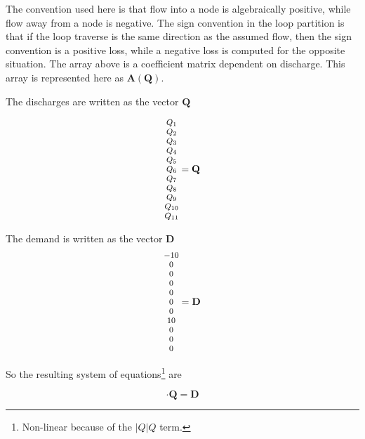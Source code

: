  The convention used here is that flow into a node is algebraically positive, while flow away from a node is negative.  The sign convention in the loop partition is that if the loop traverse is the same direction as the assumed flow, then the sign convention is a positive loss, while a negative loss is computed for the opposite situation.  The array above is a coefficient matrix dependent on discharge.  This array is represented here as $\mathbf{A}(\mathbf{Q})$. 
 
 The discharges are written as the vector  $\mathbf{Q}$
 
 \begin{displaymath}
\footnotesize
\begin{matrix}
Q_1 \\
Q_2  \\
Q_3 \\
Q_4 \\
Q_5 \\
Q_6 \\
Q_7\\
Q_8 \\
Q_9 \\
Q_{10} \\
Q_{11} \\
 \end{matrix}
 = \mathbf{Q}
 \normalsize
 \end{displaymath}
 
 The demand is written as the vector $\mathbf{D}$
 \begin{displaymath}
\footnotesize
\begin{matrix}
-10 \\
0  \\
0 \\
0\\
0 \\
0 \\
0\\
10 \\
0 \\
0 \\
0 \\
 \end{matrix}
 = \mathbf{D}
 \normalsize
 \end{displaymath} 
 
So the resulting system of equations\footnote{Non-linear because of the $|Q|Q$ term.} are 

 \begin{equation}
[\mathbf{A}(\mathbf{Q})] \cdot \mathbf{Q} = \mathbf{D}
\end{equation}

